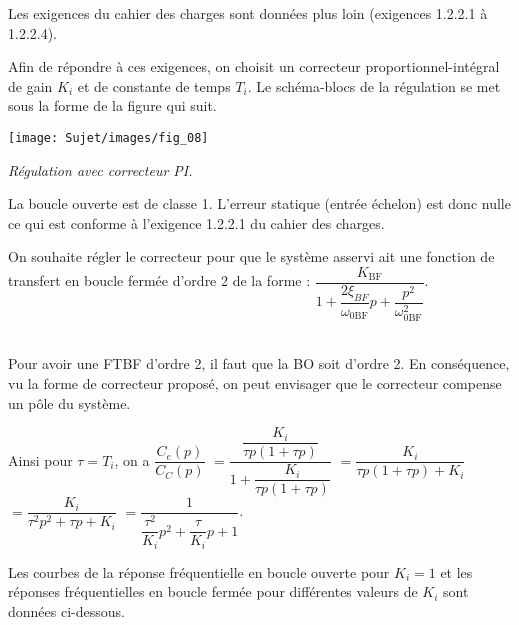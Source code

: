 \begin{multicols}{2}
\ifprof
\else
Les exigences du cahier des charges sont données plus loin (exigences 1.2.2.1 à 1.2.2.4).

Afin de répondre à ces exigences, on choisit un correcteur proportionnel-intégral de gain $K_i$ et de constante de temps $T_i$. Le schéma-blocs de la régulation se met sous la forme de la figure qui suit.

\begin{center}
\texttt{[image: Sujet/images/fig\_08]}

\footnotesize \textit{Régulation avec correcteur PI.} \normalsize
\end{center}
\fi

\ifprof
\begin{corrige}
La boucle ouverte est de classe 1. L'erreur statique (entrée échelon) est donc nulle ce qui est conforme à l'exigence 1.2.2.1 du cahier des charges. 
\end{corrige}
\else
\fi


\ifprof
\else
On souhaite régler le correcteur pour que le système asservi ait une fonction de transfert en boucle fermée
d’ordre 2 de la forme :
$\dfrac{K_{\text{BF}}}{1+\dfrac{2\xi_{BF}}{\omega_{0\text{BF}}}p+\dfrac{p^2}{\omega_{0\text{BF}}^2}}$.
\fi

\ifprof
\begin{corrige} ~\\
Pour avoir une FTBF d'ordre 2, il faut que la BO soit d'ordre 2. En conséquence, vu la forme de correcteur proposé, on peut envisager que le correcteur compense un pôle du système. 

Ainsi pour $\tau=T_i$, on a $\dfrac{C_e(p)}{C_C(p)}$
$=\dfrac{\dfrac{K_i}{\tau p\left(1+\tau p \right)}}{1+\dfrac{K_i}{\tau p\left(1+\tau p \right)}}$
$=\dfrac{K_i}{\tau p\left(1+\tau p \right)+ K_i}$
$=\dfrac{K_i}{\tau^2 p^2+\tau p+ K_i}$
$=\dfrac{1}{\dfrac{\tau^2}{K_i} p^2+\dfrac{\tau}{K_i} p+ 1}$.
\end{corrige}
\else
\fi


\ifprof
\else
Les courbes de la réponse fréquentielle en boucle ouverte pour
$K_i=1$ et les réponses fréquentielles en boucle fermée pour différentes valeurs de $K_i$ sont données ci-dessous.
\fi


\end{multicols}
